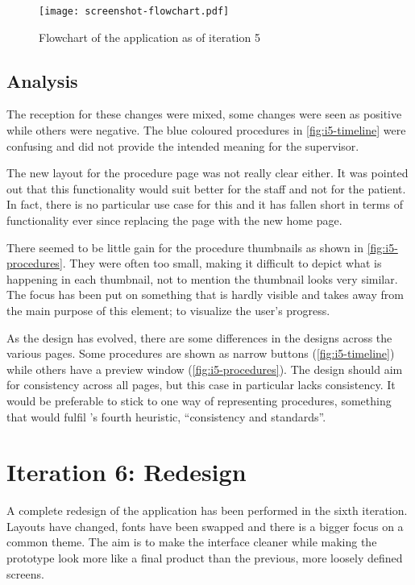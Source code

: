 \begin{figure}
    \centering
    \texttt{[image: screenshot-flowchart.pdf]}
    \caption{Flowchart of the application as of iteration 5}
    \label{fig:i5-flowchart}
\end{figure}

\subsection{Analysis}

The reception for these changes were mixed, some changes were seen as positive while others were negative. The blue coloured procedures in \autoref{fig:i5-timeline} were confusing and did not provide the intended meaning for the supervisor.

The new layout for the procedure page was not really clear either. It was pointed out that this functionality would suit better for the staff and not for the patient. In fact, there is no particular use case for this and it has fallen short in terms of functionality ever since replacing the page with the new home page.

There seemed to be little gain for the procedure thumbnails as shown in \autoref{fig:i5-procedures}. They were often too small, making it difficult to depict what is happening in each thumbnail, not to mention the thumbnail looks very similar. The focus has been put on something that is hardly visible and takes away from the main purpose of this element; to visualize the user's progress.

As the design has evolved, there are some differences in the designs across the various pages. Some procedures are shown as narrow buttons (\autoref{fig:i5-timeline}) while others have a preview window (\autoref{fig:i5-procedures}). The design should aim for consistency across all pages, but this case in particular lacks consistency. It would be preferable to stick to one way of representing procedures, something that would fulfil \textcite{nielsen1994}'s fourth heuristic, \enquote{consistency and standards}.

\section{Iteration 6: Redesign}
\label{sec:iteration6}

A complete redesign of the application has been performed in the sixth iteration. Layouts have changed, fonts have been swapped and there is a bigger focus on a common theme. The aim is to make the interface cleaner while making the prototype look more like a final product than the previous, more loosely defined screens.

